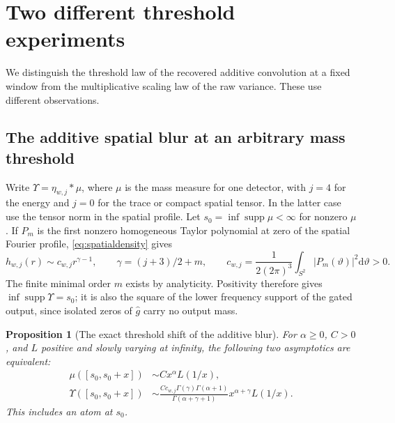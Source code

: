 \documentclass[11pt]{article}
\newtheorem{proposition}[theorem]{Proposition}
\theoremstyle{remark}
\newcommand{\dd}{\mathrm d}
\begin{document}
\section{Two different threshold experiments}
\label{sec:thresholds}

We distinguish the threshold law of the recovered additive
convolution at a fixed window from the multiplicative scaling law
of the raw variance. These use different observations.

\subsection{The additive spatial blur at an arbitrary mass threshold}

Write \(\Upsilon=\eta_{w,j}*\mu\), where \(\mu\) is the mass measure
for one detector, with \(j=4\) for the energy and \(j=0\) for the
trace or compact spatial tensor. In the latter case use the
tensor norm in the spatial profile. Let \(s_0=\inf\operatorname{supp}
\mu<\infty\) for nonzero \(\mu\). If \(P_m\) is the first nonzero
homogeneous Taylor polynomial at zero of the spatial Fourier profile,
\eqref{eq:spatialdensity} gives
\[
 h_{w,j}(r)\sim c_{w,j} r^{\gamma-1},\qquad
 \gamma=(j+3)/2+m,\qquad
 c_{w,j}=\frac{1}{2(2\pi)^3}\int_{S^2}|P_m(\vartheta)|^2\dd\vartheta>0 .
\]
The finite minimal order \(m\) exists by analyticity.
Positivity therefore gives
\(\inf\operatorname{supp}\Upsilon=s_0\);
it is also the square of the lower frequency support of
the gated output, since isolated zeros of \(\widehat g\) carry
no output mass.

\begin{proposition}[The exact threshold shift of the additive blur]
\label{thm:additive}
For \(\alpha\ge0\), \(C>0\), and \(L\) positive and slowly
varying at infinity, the following two asymptotics are equivalent:
\begin{align*}
 \mu([s_0,s_0+x])&\sim Cx^\alpha L(1/x),\\
 \Upsilon([s_0,s_0+x])&\sim
 \frac{C c_{w,j}\Gamma(\gamma)\Gamma(\alpha+1)}
      {\Gamma(\alpha+\gamma+1)}
       x^{\alpha+\gamma}L(1/x).
\end{align*}
This includes an atom at \(s_0\).
\end{proposition}
\end{document}
